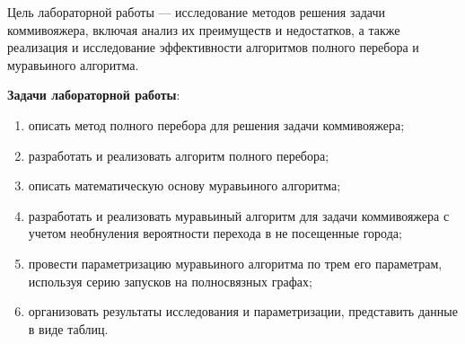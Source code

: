 
Цель лабораторной работы --- исследование методов решения задачи коммивояжера, включая анализ их преимуществ и недостатков, а также реализация и исследование эффективности алгоритмов полного перебора и муравьиного алгоритма.

\vspace{0.5cm}
\textbf{Задачи лабораторной работы}:
\begin{enumerate}
    \item описать метод полного перебора для решения задачи коммивояжера;
    \item разработать и реализовать алгоритм полного перебора;
    \item описать математическую основу муравьиного алгоритма;
    \item разработать и реализовать муравьиный алгоритм для задачи коммивояжера с учетом необнуления вероятности перехода в не посещенные города;
    \item провести параметризацию муравьиного алгоритма по трем его параметрам, используя серию запусков на полносвязных графах;
    \item организовать результаты исследования и параметризации, представить данные в виде таблиц.
\end{enumerate}

\clearpage
